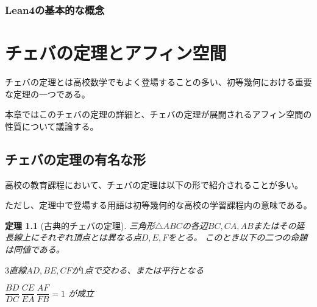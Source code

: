 \documentclass[a4paper,12pt]{bxjsbook}
\newlength{\customindent}
\newenvironment{body}{
  \par
  \begingroup
  \setlength{\leftskip}{\customindent}
  \setlength{\rightskip}{0pt}
  \setlength{\parindent}{1em}
  \setlength{\displayindent}{\customindent}
  \setlength{\displaywidth}{\dimexpr\linewidth-\customindent\relax}
}{
  \par
  \endgroup
}
\theoremstyle{theorem}
\newtheorem{theorem}{定理}[chapter]
\begin{document}
    \subsection{Lean4の基本的な概念}

    \begin{body}

    \end{body}

    \chapter{チェバの定理とアフィン空間}
    \begin{body}
        \indent チェバの定理とは高校数学でもよく登場することの多い、初等幾何における重要な定理の一つである。

        \indent 本章ではこのチェバの定理の詳細と、チェバの定理が展開されるアフィン空間の性質について議論する。

    \end{body}

    \section{チェバの定理の有名な形}

    \begin{body}
        \indent 高校の教育課程において、チェバの定理は以下の形で紹介されることが多い。

        \indent ただし、定理中で登場する用語は初等幾何的な高校の学習課程内の意味である。
    \end{body}

    \begin{theorem}[古典的チェバの定理]
        三角形$\triangle ABC$の各辺$BC, CA, AB$またはその延長線上にそれぞれ頂点とは異なる点$D, E, F$をとる。
        このとき以下の二つの命題は同値である。
        \begin{theoremenumerate}[label=(\roman*), leftmargin=4em, topsep=2pt, partopsep=0pt, itemsep=0pt, parsep=0pt]
            \item $3$直線$AD, BE, CF$が$1$点で交わる、または平行となる
            \item $\dfrac{BD}{DC}\,\dfrac{CE}{EA}\,\dfrac{AF}{FB} = 1$ が成立
        \end{theoremenumerate}
    \end{theorem}
\end{document}
